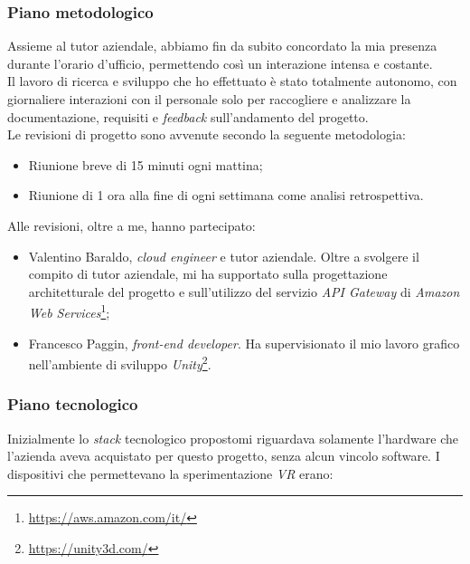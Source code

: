 \subsubsection{Piano metodologico}
	
Assieme al tutor aziendale, abbiamo fin da subito concordato la mia presenza durante l'orario d'ufficio, permettendo così un interazione intensa e costante. \\
Il lavoro di ricerca e sviluppo che ho effettuato è stato totalmente autonomo, con giornaliere interazioni con il personale solo per raccogliere e analizzare la documentazione, requisiti e \textit{feedback} sull'andamento del progetto. \\
Le revisioni di progetto sono avvenute secondo la seguente metodologia:

\begin{itemize}
	\item Riunione breve di 15 minuti ogni mattina;
	\item Riunione di 1 ora alla fine di ogni settimana come analisi retrospettiva.
\end{itemize}

Alle revisioni, oltre a me, hanno partecipato:

\begin{itemize}
	\item Valentino Baraldo, \textit{cloud engineer} e tutor aziendale. Oltre a svolgere il compito di tutor aziendale, mi ha supportato sulla progettazione architetturale del progetto e sull'utilizzo del servizio \textit{API Gateway} di \textit{Amazon Web Services}\footnote[1]{\url{https://aws.amazon.com/it/}};
	\item Francesco Paggin, \textit{front-end developer}. Ha supervisionato il mio lavoro grafico nell'ambiente di sviluppo \textit{Unity}\footnote[2]{\url{https://unity3d.com/}}.
\end{itemize}  

\subsubsection{Piano tecnologico}

Inizialmente lo \textit{stack} tecnologico propostomi riguardava solamente l'hardware che l'azienda aveva acquistato per questo progetto, senza alcun vincolo software. I dispositivi che permettevano la sperimentazione \textit{VR} erano:

